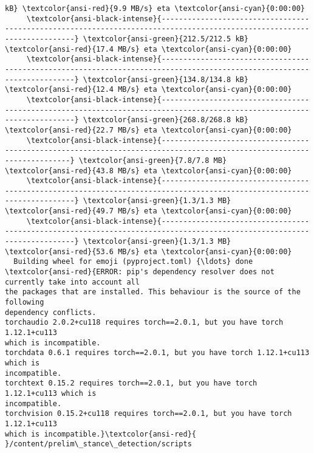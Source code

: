 \documentclass[11pt]{article}
\begin{document}
\begin{Verbatim}[commandchars=\\\{\}]
kB} \textcolor{ansi-red}{9.9 MB/s} eta \textcolor{ansi-cyan}{0:00:00}
     \textcolor{ansi-black-intense}{------------------------------------------------------------------------------------------------------------------------} \textcolor{ansi-green}{212.5/212.5 kB}
\textcolor{ansi-red}{17.4 MB/s} eta \textcolor{ansi-cyan}{0:00:00}
     \textcolor{ansi-black-intense}{------------------------------------------------------------------------------------------------------------------------} \textcolor{ansi-green}{134.8/134.8 kB}
\textcolor{ansi-red}{12.4 MB/s} eta \textcolor{ansi-cyan}{0:00:00}
     \textcolor{ansi-black-intense}{------------------------------------------------------------------------------------------------------------------------} \textcolor{ansi-green}{268.8/268.8 kB}
\textcolor{ansi-red}{22.7 MB/s} eta \textcolor{ansi-cyan}{0:00:00}
     \textcolor{ansi-black-intense}{-----------------------------------------------------------------------------------------------------------------------} \textcolor{ansi-green}{7.8/7.8 MB}
\textcolor{ansi-red}{43.8 MB/s} eta \textcolor{ansi-cyan}{0:00:00}
     \textcolor{ansi-black-intense}{------------------------------------------------------------------------------------------------------------------------} \textcolor{ansi-green}{1.3/1.3 MB}
\textcolor{ansi-red}{49.7 MB/s} eta \textcolor{ansi-cyan}{0:00:00}
     \textcolor{ansi-black-intense}{------------------------------------------------------------------------------------------------------------------------} \textcolor{ansi-green}{1.3/1.3 MB}
\textcolor{ansi-red}{53.6 MB/s} eta \textcolor{ansi-cyan}{0:00:00}
  Building wheel for emoji (pyproject.toml) {\ldots} done
\textcolor{ansi-red}{ERROR: pip's dependency resolver does not currently take into account all
the packages that are installed. This behaviour is the source of the following
dependency conflicts.
torchaudio 2.0.2+cu118 requires torch==2.0.1, but you have torch 1.12.1+cu113
which is incompatible.
torchdata 0.6.1 requires torch==2.0.1, but you have torch 1.12.1+cu113 which is
incompatible.
torchtext 0.15.2 requires torch==2.0.1, but you have torch 1.12.1+cu113 which is
incompatible.
torchvision 0.15.2+cu118 requires torch==2.0.1, but you have torch 1.12.1+cu113
which is incompatible.}\textcolor{ansi-red}{
}/content/prelim\_stance\_detection/scripts
    \end{Verbatim}
\end{document}
